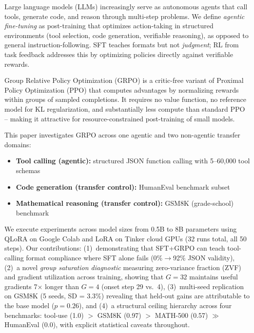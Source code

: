 \documentclass{article}
\begin{document}
Large language models (LLMs) increasingly serve as autonomous agents that call tools, generate code, and reason through multi-step problems. We define \emph{agentic fine-tuning} as post-training that optimizes action-taking in structured environments (tool selection, code generation, verifiable reasoning), as opposed to general instruction-following. SFT teaches formats but not \emph{judgment}; RL from task feedback addresses this by optimizing policies directly against verifiable rewards.

Group Relative Policy Optimization (GRPO) \citep{shao2024deepseekmath} is a critic-free variant of Proximal Policy Optimization (PPO) that computes advantages by normalizing rewards within groups of sampled completions. It requires no value function, no reference model for KL regularization, and substantially less compute than standard PPO -- making it attractive for resource-constrained post-training of small models.

This paper investigates GRPO across one agentic and two non-agentic transfer domains:
\begin{itemize}
    \item \textbf{Tool calling (agentic):} structured JSON function calling with 5--60,000 tool schemas
    \item \textbf{Code generation (transfer control):} HumanEval benchmark subset
    \item \textbf{Mathematical reasoning (transfer control):} GSM8K (grade-school) benchmark
\end{itemize}

We execute experiments across model sizes from 0.5B to 8B parameters using QLoRA on Google Colab and LoRA on Tinker cloud GPUs (32 runs total, all 50 steps). Our contributions: (1)~demonstrating that SFT+GRPO can teach tool-calling format compliance where SFT alone fails (0\%$\rightarrow$92\% JSON validity), (2)~a novel \emph{group saturation diagnostic} measuring zero-variance fraction (ZVF) and gradient utilization across training, showing that $G{=}32$ maintains useful gradients 7$\times$ longer than $G{=}4$ (onset step 29 vs.\ 4), (3)~multi-seed replication on GSM8K (5 seeds, SD = 3.3\%) revealing that held-out gains are attributable to the base model ($p{=}0.26$), and (4)~a structural ceiling hierarchy across four benchmarks: tool-use (1.0) $>$ GSM8K (0.97) $>$ MATH-500 (0.57) $\gg$ HumanEval (0.0), with explicit statistical caveats throughout.

\end{document}
